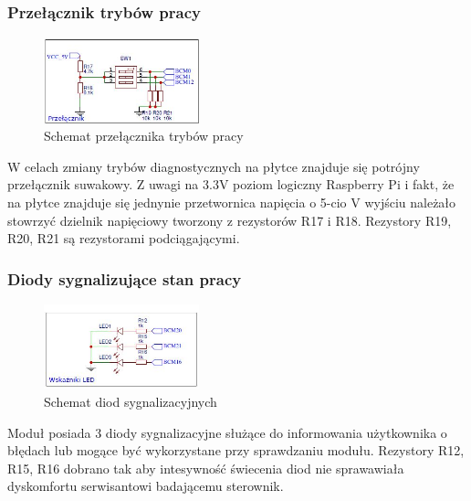 \documentclass[12pt, eng, twoside, openany, final]{mgr}
\begin{document}
        \subsubsection{Przełącznik trybów pracy}
            \begin{figure}[H]
            \begin{center}
                \includegraphics[width=0.4\textwidth]{przelacznik.jpg}
                \caption{Schemat przełącznika trybów pracy}
            \end{center}
            \end{figure}
        W celach zmiany trybów diagnostycznych na płytce znajduje się potrójny przełącznik suwakowy. Z uwagi na 3.3V poziom logiczny Raspberry Pi i fakt, że na płytce znajduje się jednynie przetwornica napięcia o 5-cio V wyjściu należało stowrzyć dzielnik napięciowy tworzony z rezystorów R17 i R18. Rezystory R19, R20, R21 są rezystorami podciągającymi.  
        \subsubsection{Diody sygnalizujące stan pracy}
            \begin{figure}[H]
            \begin{center}
                \includegraphics[width=0.4\textwidth]{wskaznik.jpg}
                \caption{Schemat diod sygnalizacyjnych} 
            \end{center}
            \end{figure}
        Moduł posiada 3 diody sygnalizacyjne służące do informowania użytkownika o błędach lub mogące być wykorzystane przy sprawdzaniu modułu. Rezystory R12, R15, R16 dobrano tak aby intesywność świecenia diod nie sprawawiała dyskomfortu serwisantowi badającemu sterownik.
        
\end{document}
